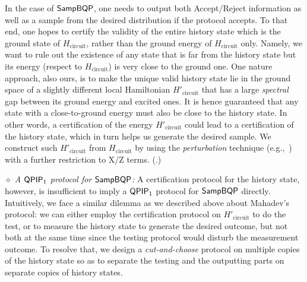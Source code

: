 In the case of $\operatorname{\mathsf{SampBQP}}$, one needs to output both Accept/Reject information as well as a sample from the desired distribution if the protocol accepts. 
To that end, one hopes to certify the validity of the entire history state which is the ground state of $H_{\mathrm{circuit}}$, rather than the ground energy of $H_{\mathrm{circuit}}$ only. 
Namely, we want to rule out the existence of any state that is far from the history state but its energy (respect to $H_{\mathrm{circuit}}$) is very close to the ground one. 
One nature approach, also ours, is to make the unique valid history state lie in the ground space of a slightly different local Hamiltonian $H'_{\mathrm{circuit}}$ that has a large \emph{spectral} gap between its ground energy and excited ones.
It is hence guaranteed that any state with a close-to-ground energy must also be close to the history state.
In other words, a certification of the energy $H'_{\mathrm{circuit}}$ could lead to a certification of the history state, which in turn helps us generate the desired sample. 
We construct such $H'_{\mathrm{circuit}}$ from $H_{\mathrm{circuit}}$ by using the \emph{perturbation} technique (e.g.,~\cite{kempe_kitaev_regev_2006}) with a further restriction to X/Z terms. (.)

\vspace{2mm} \noindent \emph{$\diamond$ A $\operatorname{\mathsf{QPIP}}_1$ protocol for $\operatorname{\mathsf{SampBQP}}$:} A certification protocol for the history state, however, is insufficient to imply a $\operatorname{\mathsf{QPIP}}_1$ protocol for $\operatorname{\mathsf{SampBQP}}$ directly. 
Intuitively, we face a similar dilemma as we described above about Mahadev's protocol: we can either employ the certification protocol on $H'_{\mathrm{circuit}}$ to do the test, or to measure the history state to generate the desired outcome, but not both at the same time since the testing protocol would disturb the measurement outcome.
To resolve that, we design a \emph{cut-and-choose} protocol on multiple copies of the history state so as to separate the testing and the outputting parts on separate copies of history states. 

